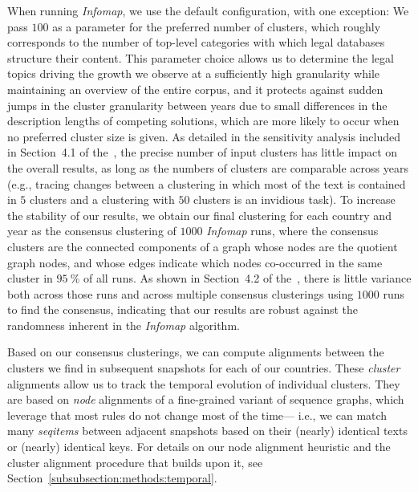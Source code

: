 When running \emph{Infomap}, we use the default configuration, with one exception:
We pass $100$ as a parameter for the preferred number of clusters, 
which roughly corresponds to the number of top-level categories with which legal databases structure their content.  
This parameter choice allows us to determine the legal topics driving the growth we observe at a sufficiently high granularity while maintaining an overview of the entire corpus, 
and it protects against sudden jumps in the cluster granularity between years due to small differences in the description lengths of competing solutions, which are more likely to occur when no preferred cluster size is given. 
As detailed in the sensitivity analysis included in Section~4.1 of the~\suppi, 
the precise number of input clusters has little impact on the overall results, 
as long as the numbers of clusters are comparable across years (e.g., tracing changes between a clustering in which most of the text is contained in $5$ clusters and a clustering with $50$ clusters is an invidious task). 
To increase the stability of our results, we obtain our final clustering for each country and year as the consensus clustering of $1000$ \emph{Infomap} runs, 
where the consensus clusters are the connected components of a graph whose nodes are the quotient graph nodes, 
and whose edges indicate which nodes co-occurred in the same cluster in $95~\%$ of all runs.
As shown in Section~4.2 of the~\suppi, 
there is little variance both across those runs and across multiple consensus clusterings using $1000$ runs to find the consensus, 
indicating that our results are robust against the randomness inherent in the \emph{Infomap} algorithm.  

Based on our consensus clusterings, 
we can compute alignments between the clusters we find in subsequent snapshots for each of our countries. 
These \emph{cluster} alignments allow us to track the temporal evolution of individual clusters.
They are based on \emph{node} alignments of a fine-grained variant of sequence graphs, 
which leverage that most rules do not change most of the time---%
i.e., we can match many \emph{seqitems} between adjacent snapshots based on their (nearly) identical texts or (nearly) identical keys. 
For details on our node alignment heuristic and the cluster alignment procedure that builds upon it, see Section~\ref{subsubsection:methods:temporal}.

